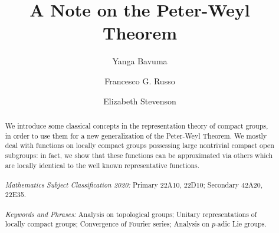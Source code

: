 \documentclass{amsart}
\theoremstyle{definition}
\numberwithin{equation}{section}
\begin{document}
\title[A Note on the Peter-Weyl Theorem]{A Note on the  Peter-Weyl Theorem}


\author[Y. Bavuma]{Yanga Bavuma}
\address{Yanga Bavuma\endgraf
Department of Mathematics and Applied Mathematics\endgraf
University of Cape Town\endgraf
Private Bag X1, Rondebosch, 7701, Cape Town, South Africa\endgraf
Email: \texttt{yanga.bavuma@uct.ac.za} -- \href{https://orcid.org/0000-0001-8991-6071}{ORCID: 0000-0001-8991-6071}}

\author[F.G. Russo]{Francesco G. Russo}
\address{Francesco G. Russo\endgraf
School of Science and Technology\endgraf
University of Camerino\endgraf
via Madonna delle Carceri 9, 62032, Camerino, Italy\endgraf
Email: \texttt{francesco.russo@unicam.it} -- \href{https://orcid.org/0000-0002-5889-783X}{ORCID: 0000-0002-5889-783X}}


\author[E. Stevenson]{Elizabeth Stevenson}
\address{Elizabeth Stevenson\endgraf
Department of Mathematics and Applied Mathematics\endgraf
University of Cape Town\endgraf
Private Bag X1, Rondebosch, 7701, Cape Town, South Africa\endgraf
Email: \texttt{stveli004@myuct.ac.za} -- \href{https://orcid.org/0009-0002-2821-0221}{ORCID: 0009-0002-2821-0221}}




\maketitle



\begin{abstract}We introduce some classical concepts in the representation theory of compact groups, in order to  use them for a new generalization of the Peter-Weyl Theorem. We mostly deal with functions on locally compact groups possessing large nontrivial compact open subgroups: in fact, we show that these functions can be approximated via others which are locally identical to the well known representative functions.\\ 
\\
\textit{Mathematics Subject Classification 2020:} Primary 22A10, 22D10; Secondary 42A20, 22E35.\\
\\
\textit{Keywords and Phrases:} Analysis on topological groups; Unitary representations of locally compact groups; Convergence of Fourier series; Analysis on $p$-adic Lie groups.
\end{abstract}



\maketitle
\end{document}
